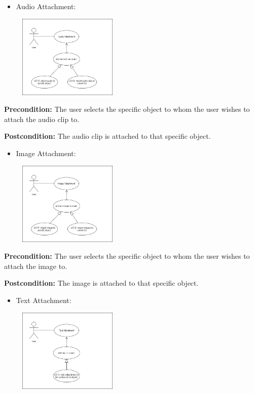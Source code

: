 \documentclass{article}
\begin{document}
\begin{flushleft}
	\begin{itemize}
		\item Audio Attachment:
	\end{itemize}

	\begin{center}
	\includegraphics[width=250px,height=150px]{AudioAttachment.png}
	\end{center}

	\textbf{Precondition:} The user selects the specific object to whom the user wishes to attach the audio clip to.

	\textbf{Postcondition:} The audio clip is attached to that specific object.

	\begin{itemize}
		\item Image Attachment:
	\end{itemize}

	\begin{center}
	\includegraphics[width=250px,height=150px]{ImageAttachment.png}
	\end{center}

	\textbf{Precondition:} The user selects the specific object to whom the user wishes to attach the image to.

	\textbf{Postcondition:} The image is attached to that specific object.

	\begin{itemize}
		\item Text Attachment:
	\end{itemize}

	\begin{center}
	\includegraphics[width=250px,height=150px]{TextAttachment.png}
	\end{center}


\end{flushleft}
\end{document}
